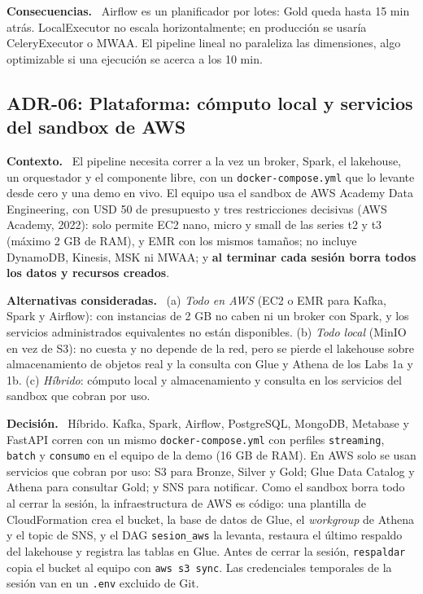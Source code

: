 \documentclass[12pt,letterpaper]{article}
\newcommand{\code}[1]{{\small\texttt{#1}}}
\newcommand{\adrpart}[1]{\textbf{#1.}~}
\begin{document}
\adrpart{Consecuencias} Airflow es un planificador por lotes: Gold queda hasta 15 min atrás. LocalExecutor no escala horizontalmente; en producción se usaría CeleryExecutor o MWAA. El pipeline lineal no paraleliza las dimensiones, algo optimizable si una ejecución se acerca a los 10 min.

\subsection*{ADR-06: Plataforma: cómputo local y servicios del sandbox de AWS}

\adrpart{Contexto} El pipeline necesita correr a la vez un broker, Spark, el lakehouse, un orquestador y el componente libre, con un \code{docker-compose.yml} que lo levante desde cero y una demo en vivo. El equipo usa el sandbox de AWS Academy Data Engineering, con USD 50 de presupuesto y tres restricciones decisivas (AWS Academy, 2022): solo permite EC2 nano, micro y small de las series t2 y t3 (máximo 2 GB de RAM), y EMR con los mismos tamaños; no incluye DynamoDB, Kinesis, MSK ni MWAA; y \textbf{al terminar cada sesión borra todos los datos y recursos creados}.

\adrpart{Alternativas consideradas} (a) \emph{Todo en AWS} (EC2 o EMR para Kafka, Spark y Airflow): con instancias de 2 GB no caben ni un broker con Spark, y los servicios administrados equivalentes no están disponibles. (b) \emph{Todo local} (MinIO en vez de S3): no cuesta y no depende de la red, pero se pierde el lakehouse sobre almacenamiento de objetos real y la consulta con Glue y Athena de los Labs 1a y 1b. (c) \emph{Híbrido}: cómputo local y almacenamiento y consulta en los servicios del sandbox que cobran por uso.

\adrpart{Decisión} Híbrido. Kafka, Spark, Airflow, PostgreSQL, MongoDB, Metabase y FastAPI corren con un mismo \code{docker-compose.yml} con perfiles \code{streaming}, \code{batch} y \code{consumo} en el equipo de la demo (16 GB de RAM). En AWS solo se usan servicios que cobran por uso: S3 para Bronze, Silver y Gold; Glue Data Catalog y Athena para consultar Gold; y SNS para notificar. Como el sandbox borra todo al cerrar la sesión, la infraestructura de AWS es código: una plantilla de CloudFormation crea el bucket, la base de datos de Glue, el \emph{workgroup} de Athena y el topic de SNS, y el DAG \code{sesion\_aws} la levanta, restaura el último respaldo del lakehouse y registra las tablas en Glue. Antes de cerrar la sesión, \code{respaldar} copia el bucket al equipo con \code{aws s3 sync}. Las credenciales temporales de la sesión van en un \code{.env} excluido de Git.
\end{document}
